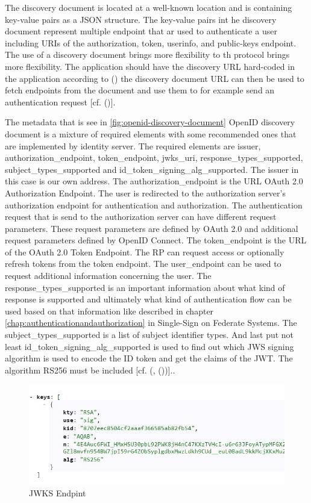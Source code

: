 The discovery document is located at a well-known location and is containing key-value pairs as a JSON structure. The key-value pairs int he discovery document represent multiple endpoint that ar used to authenticate a user including URIs of the authorization, token, userinfo, and public-keys endpoint. The use of a discovery document brings more flexibility to th protocol brings more flexibility. The application should have the discovery URL hard-coded in the application according to (\cite{Google:2018:IdentityPlatform}) the discovery document URL can then be used to fetch endpoints from the document and use them to for example send an authentication request [cf. (\cite{Google:2018:IdentityPlatform})].

The metadata that is see in \ref{fig:openid-discovery-document} OpenID discovery document is a mixture of required elements with some recommended ones that are implemented by identity server. The required elements are issuer, authorization\_endpoint, token\_endpoint, jwks\_uri, response\_types\_supported, subject\_types\_supported and id\_token\_signing\_alg\_supported. The issuer in this case is our own address. The authorization\_endpoint is the URL OAuth 2.0 Authorization Endpoint. The user is redirected to the authorization server's authorization endpoint for authentication and authorization. The authentication request that is send to the authorization server can have different request parameters. These request parameters are defined by OAuth 2.0 and additional request parameters defined by OpenID Connect. The token\_endpoint is the URL of the OAuth 2.0 Token Endpoint. The RP can request access or optionally refresh tokens from the token endpoint. The user\_endpoint can be used to request additional information concerning the user. The response\_types\_supported is an important information about what kind of response is supported and ultimately what kind of authentication flow can be used based on that information like described in chapter \ref{chap:authenticationandauthorization} in Single-Sign on Federate Systems. The subject\_types\_supported is a list of subject identifier types. And last put not least id\_token\_signing\_alg\_supported is used to find out which JWS signing algorithm is used to encode the ID token and get the claims of the JWT. The algorithm RS256 must be included [cf. (\cite{Sakimura:OIDCC}, (\cite{Sakimura:OIDCD}))].. 

\begin{figure}[h]
	\centering
	\includegraphics[width=0.7\linewidth]{images/jwkDiscovoryDocument}
	\caption{JWKS Endpint}
	\label{fig:jwkdiscovorydocument}
\end{figure}

